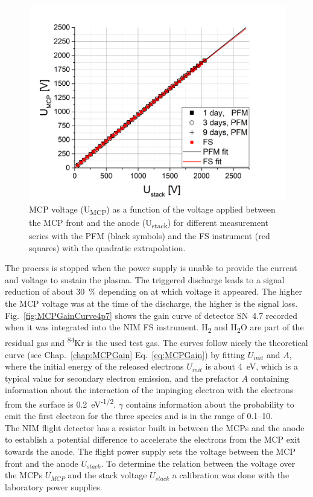 	\begin{figure}[h!] %
		\centering
		\includegraphics[width=.8\textwidth]{Experiments/PFM_UstackUmccp_TimeEvol.png}
		\caption{MCP voltage (U\textsubscript{MCP}) as a function of the voltage applied between the MCP front and the anode (U\textsubscript{stack}) for different measurement series with the PFM (black symbols) and the FS instrument (red squares) with the quadratic extrapolation.}
		\label{fig:PFMUstackUmcpTimeEvol}
	\end{figure}
	The process is stopped when the power supply is unable to provide the current and voltage to sustain the plasma. The triggered discharge leads to a signal reduction of about 30~\% depending on at which voltage it appeared. The higher the MCP voltage was at the time of the discharge, the higher is the signal loss.\\
	Fig.~\ref{fig:MCPGainCurve4p7} shows the gain curve of detector SN~4.7 recorded when it was integrated into the NIM FS instrument. H\textsubscript{2} and H\textsubscript{2}O are part of the residual gas and \textsuperscript{84}Kr is the used test gas. The curves follow nicely the theoretical curve (see Chap.~\ref{chap:MCPGain} Eq.~\eqref{eq:MCPGain}) by fitting $U_{init}$ and $A$, where the initial energy of the released electrons $U_{init}$ is about 4~eV, which is a typical value for secondary electron emission, and the prefactor $A$ containing information about the interaction of the impinging electron with the electrons from the surface is 0.2~eV\textsuperscript{-1/2}. $\gamma$ contains information about the probability to emit the first electron for the three species and is in the range of 0.1--10.\\
	The NIM flight detector has a resistor built in between the MCPs and the anode to establish a potential difference to accelerate the electrons from the MCP exit towards the anode. The flight power supply sets the voltage between the MCP front and the anode $U_{stack}$. To determine the relation between the voltage over the MCPs $U_{MCP}$ and the stack voltage $U_{stack}$ a calibration was done with the laboratory power supplies.\\

